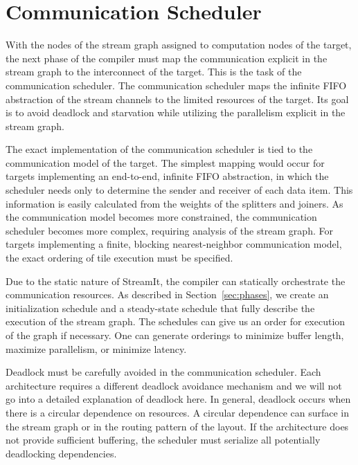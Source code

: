 \section{Communication Scheduler}
\label{sec:communic}

With the nodes of the stream graph assigned to computation nodes of
the target, the next phase of the compiler must map the communication
explicit in the stream graph to the interconnect of the target.  This
is the task of the communication scheduler.  The communication
scheduler maps the infinite FIFO abstraction of the stream channels to
the limited resources of the target.  Its goal is to avoid deadlock
and starvation while utilizing the parallelism explicit in the stream
graph.

The exact implementation of the communication scheduler is tied to the
communication model of the target.  The simplest mapping would occur
for targets implementing an end-to-end, infinite FIFO abstraction, in
which the scheduler needs only to determine the sender and receiver of
each data item.  This information is easily calculated from the
weights of the splitters and joiners.  As the communication model
becomes more constrained, the communication scheduler becomes more
complex, requiring analysis of the stream graph. For targets
implementing a finite, blocking nearest-neighbor communication model,
the exact ordering of tile execution must be specified.

Due to the static nature of StreamIt, the compiler can statically
orchestrate the communication resources.  As described in
Section~\ref{sec:phases}, we create an initialization schedule and a
steady-state schedule that fully describe the execution of the stream
graph.  The schedules can give us an order for execution of the graph
if necessary.  One can generate orderings to minimize buffer length,
maximize parallelism, or minimize latency.


Deadlock must be carefully avoided in the communication
scheduler. Each architecture requires a different deadlock avoidance
mechanism and we will not go into a detailed explanation of deadlock
here.  In general, deadlock occurs when there is a circular dependence
on resources.  A circular dependence can surface in the stream graph
or in the routing pattern of the layout.  If the architecture does not
provide sufficient buffering, the scheduler must serialize all
potentially deadlocking dependencies.

